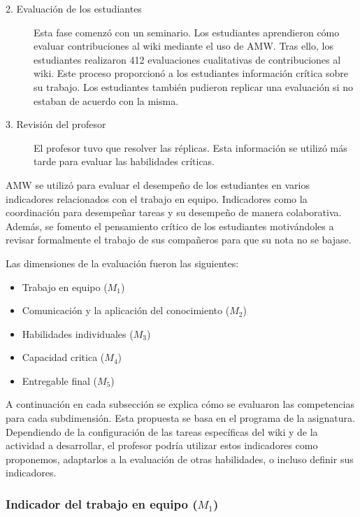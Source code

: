 \begin{description}
\item[2. Evaluación de los estudiantes]

Esta fase comenzó con un seminario. Los estudiantes aprendieron cómo evaluar contribuciones al wiki mediante el uso de AMW. Tras ello, los estudiantes realizaron 412 evaluaciones cualitativas de contribuciones al wiki. Este proceso proporcionó a los estudiantes información crítica sobre su trabajo. Los estudiantes también pudieron replicar una evaluación si no estaban de acuerdo con la misma.

\item[3. Revisión del profesor]

El profesor tuvo que resolver las réplicas. Esta información se utilizó más tarde para evaluar las habilidades críticas.

\end{description}

AMW se utilizó para evaluar el desempeño de los estudiantes en varios indicadores relacionados con el trabajo en equipo. Indicadores como la coordinación para desempeñar tareas y su desempeño de manera colaborativa. Además, se fomento el pensamiento crítico de los estudiantes motivándoles a revisar formalmente el trabajo de sus compañeros para que su nota no se bajase.

Las dimensiones de la evaluación fueron las siguientes:
\begin{itemize}
	\item Trabajo en equipo ($M_1$)
	\item Comunicación y la aplicación del conocimiento ($M_2$)
	\item Habilidades individuales ($M_3$)
	\item Capacidad critica ($M_4$)
	\item Entregable final ($M_5$)
\end{itemize}

A continuación en cada subsección se explica cómo se evaluaron las competencias para cada subdimensión. Esta propuesta se basa en el programa de la asignatura. Dependiendo de la configuración de las tareas específicas del wiki y de la actividad a desarrollar, el profesor podría utilizar estos indicadores como proponemos, adaptarlos a la evaluación de otras habilidades, o incluso definir sus indicadores.

\subsubsection{Indicador del trabajo en equipo ($M_1$)}

